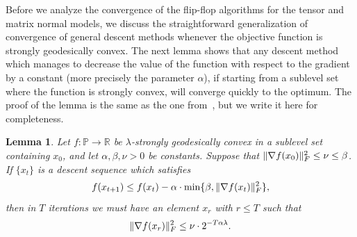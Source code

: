 \documentclass[aos]{imsart}
\newtheorem{lemma}[theorem]{Lemma}
\theoremstyle{definition}
\numberwithin{equation}{section}
\DeclarePairedDelimiter{\norm}{\lVert}{\rVert}
\newcommand{\R}{{\mathbb{R}}}
\newcommand{\SPD}{\mathbb{P}}
\begin{document}
Before we analyze the convergence of the flip-flop algorithms for the tensor and matrix normal models, we discuss the straightforward generalization of convergence of general descent methods whenever the objective function is strongly geodesically convex. 
The next lemma shows that any descent method which manages to decrease the value of the function with respect to the gradient by a constant (more precisely the parameter $\alpha$), if starting from a sublevel set where the function is strongly convex, will converge quickly to the optimum.
The proof of the lemma is the same as the one from~\cite[Lemma 4.8]{FM20}, but we write it here for completeness.

\begin{lemma}\label{lem:descent-sublevel-set}
	Let $f : \SPD \rightarrow \R$ be $\lambda$-strongly geodesically convex in a sublevel set containing $x_0$, and let $\alpha, \beta, \nu > 0$ be constants. Suppose that $\norm{\nabla f(x_0)}_F^2 \leq \nu \leq \beta$.
	If $\{x_t\}$ is a descent sequence which satisfies
	$$ f(x_{t+1}) \leq f(x_t) - \alpha \cdot \min\{\beta,  \norm{\nabla f(x_t)}^2_F \},$$
	then in $T$ iterations we must have an element $x_r$ with $r \leq T$ such that
	$$ \norm{\nabla f(x_r)}^2_F \leq \nu \cdot 2^{- T \alpha \lambda}.   $$
\end{lemma}
\end{document}
